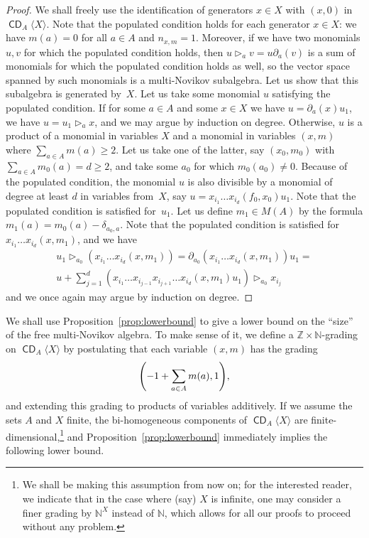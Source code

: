 \documentclass[AHL,Unicode,longabstracts]{cedram}
\newcommand{\bbN}{\mathbb{N}}
\newcommand{\bbZ}{\mathbb{Z}}
\DeclareMathOperator{\CDi}{\mathsf{CD}}
\let\originalleft\left
\let\originalright\right
\renewcommand{\left}{\mathopen{}\mathclose\bgroup\originalleft}
\renewcommand{\right}{\aftergroup\egroup\originalright}
\begin{document}
\begin{proof}
We shall freely use the identification of generators $x\in X$ with $(x,0)$ in $\CDi_A\langle X\rangle$. Note that the populated condition holds for each generator $x\in X$: we have $m(a)=0$ for all $a\in A$ and $n_{x,m}=1$. Moreover, if we have two monomials $u,v$ for which the populated condition holds, then $u\triangleright_a v=u\partial_a(v)$ is a sum of monomials for which the populated condition holds as well, so the vector space spanned by such monomials is a multi-Novikov subalgebra. Let us show that this subalgebra is generated by~$X$. Let us take some monomial $u$ satisfying the populated condition. If for some $a\in A$ and some $x\in X$ we have $u=\partial_a(x)u_1$, we have $u=u_1\triangleright_a x$, and we may argue by induction on degree. Otherwise, $u$ is a product of a monomial in variables $X$ and a monomial in variables $(x,m)$ where $\sum_{a\in A}m(a)\ge 2$. Let us take one of the latter, say $(x_0,m_0)$ with $\sum_{a\in A}m_0(a)=d\ge 2$, and take some $a_0$ for which $m_0(a_0)\ne 0$. Because of the populated condition, the monomial $u$ is also divisible by a monomial of degree at least $d$ in variables from~$X$, say $u=x_{i_1}\dots x_{i_d}(f_0,x_0)u_1$. Note that the populated condition is satisfied for~$u_1$. Let us define $m_1\in M(A)$ by the formula $m_1(a)=m_0(a)-\delta_{a_0,a}$. Note that the populated condition is satisfied for $x_{i_1}\dots x_{i_d}(x,m_1)$, and we have
\begin{multline}
u_1\triangleright_{a_0}(x_{i_1}\dots x_{i_d}(x,m_1))=\partial_{a_0}(x_{i_1}\dots x_{i_d}(x,m_1))u_1=\\ u+\sum_{j=1}^d (x_{i_1}\dots x_{i_{j-1}} x_{i_{j+1}}\dots x_{i_d}(x,m_1)u_1)\triangleright_{a_0}x_{i_j}
\end{multline}
and we once again may argue by induction on degree.
\end{proof}

We shall use Proposition~\ref{prop:lowerbound} to give a lower bound on the ``size'' of the free multi-Novikov algebra. To make sense of it, we define a $\bbZ\times \bbN$-grading on $\CDi_A\langle X\rangle$ by postulating that each variable $(x,m)$ has the grading
\[
\left(-1+\sum_{a\in A}m(a),1\right),
\]
and extending this grading to products of variables additively. If we assume the sets $A$ and $X$ finite, the bi-homogeneous components of $\CDi_A\langle X\rangle$ are finite-dimensional,\footnote{We shall be making this assumption from now on; for the interested reader, we indicate that in the case where (say) $X$ is infinite, one may consider a finer grading by $\bbN^X$ instead of $\bbN$, which allows for all our proofs to proceed without any problem.} and Proposition~\ref{prop:lowerbound} immediately implies the following lower bound.
\end{document}
